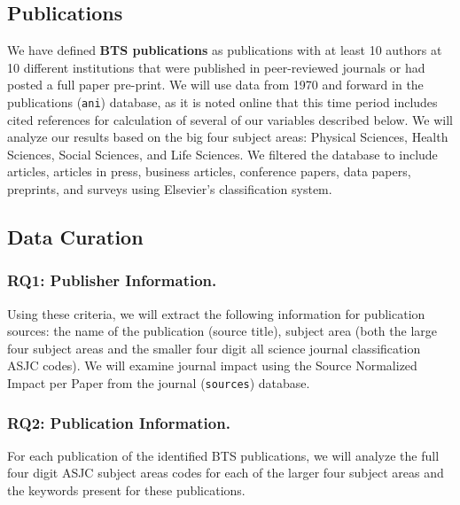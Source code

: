\documentclass[
  man]{apa7}
\begin{document}
\hypertarget{publications}{%
\subsection{Publications}\label{publications}}

We have defined \textbf{BTS publications} as publications with at least 10
authors at 10 different institutions that were published in
peer-reviewed journals or had posted a full paper pre-print. We will use
data from 1970 and forward in the publications (\texttt{ani}) database, as it
is noted online that this time period includes cited references for
calculation of several of our variables described below. We will analyze
our results based on the big four subject areas: Physical Sciences,
Health Sciences, Social Sciences, and Life Sciences. We filtered the
database to include articles, articles in press, business articles,
conference papers, data papers, preprints, and surveys using Elsevier's
classification system.

\hypertarget{data-curation}{%
\subsection{Data Curation}\label{data-curation}}

\hypertarget{rq1-publisher-information.}{%
\subsubsection{RQ1: Publisher Information.}\label{rq1-publisher-information.}}

Using these criteria, we will extract the following information for
publication sources: the name of the publication (source title), subject
area (both the large four subject areas and the smaller four digit all
science journal classification ASJC codes). We will examine journal
impact using the Source Normalized Impact per Paper from the journal
(\texttt{sources}) database.

\hypertarget{rq2-publication-information.}{%
\subsubsection{RQ2: Publication Information.}\label{rq2-publication-information.}}

For each publication of the identified BTS publications, we will analyze
the full four digit ASJC subject areas codes for each of the larger four
subject areas and the keywords present for these publications.
\end{document}
